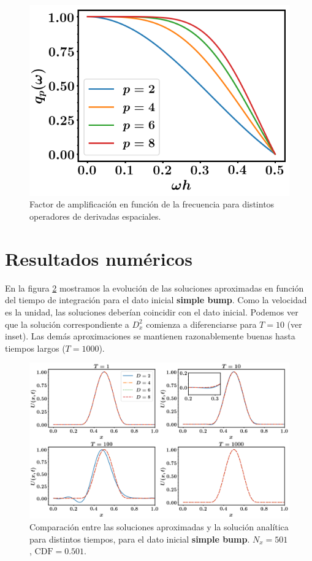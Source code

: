 \documentclass[12pt]{article}
\begin{document}
\begin{figure}
\center
\includegraphics[scale=0.5]{amplification.png}
\caption{Factor de amplificaci\'on en funci\'on de la frecuencia para distintos operadores de derivadas espaciales.} \label{fig:ampli}
\end{figure}

\section{Resultados num\'ericos}

En la figura \ref{fig:simple} mostramos la evoluci\'on de las soluciones aproximadas en funci\'on del tiempo de integraci\'on para el dato inicial \textbf{simple bump}. Como la velocidad es la unidad, las soluciones deber\'ian coincidir con el dato inicial. Podemos ver que la soluci\'on correspondiente a $D_x^2$ comienza a diferenciarse para $T=10$ (ver inset). Las dem\'as aproximaciones se mantienen razonablemente buenas hasta tiempos largos ($T=1000$). 

\begin{figure}
\center
\includegraphics[scale=0.3]{simple.png}
\caption{Comparaci\'on entre las soluciones aproximadas y la soluci\'on anal\'itica para distintos tiempos, para el dato inicial \textbf{simple bump}. $N_x=501$, $\mathrm{CDF} = 0.501$.} \label{fig:simple}
\end{figure}
\end{document}
